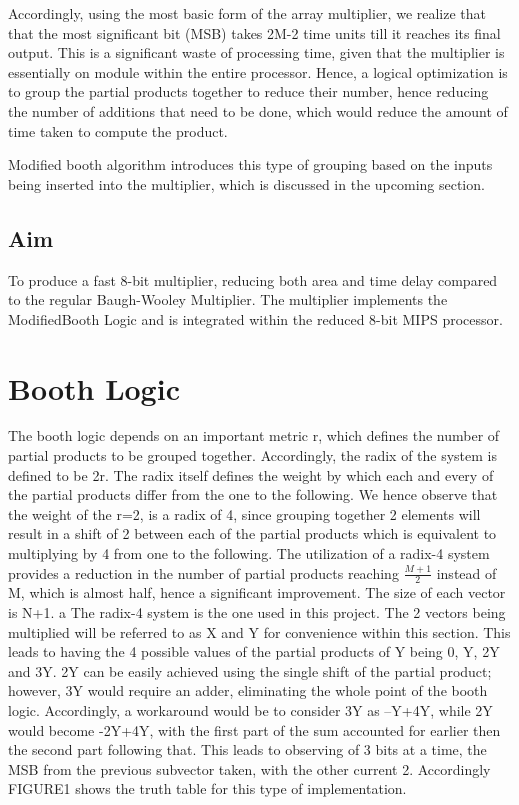 \documentclass[conference]{IEEEtran}
\begin{document}
Accordingly, using the most basic form of the array multiplier, we realize that that the most significant bit (MSB) takes 2M-2 time units till it reaches its final output. This is a significant waste of processing time, given that the multiplier is essentially on module within the entire processor. Hence, a logical optimization is to group the partial products together to reduce their number, hence reducing the number of additions that need to be done, which would reduce the amount of time taken to compute the product.

Modified booth algorithm introduces this type of grouping based on the inputs being inserted into the multiplier, which is discussed in the upcoming section.


\subsection{Aim}

To produce a fast 8-bit multiplier, reducing both area and time delay compared to the regular Baugh-Wooley Multiplier. The multiplier implements the ModifiedBooth Logic and is integrated within the reduced 8-bit MIPS processor.


\section{Booth Logic}

The booth logic depends on an important metric r, which defines the number of partial products to be grouped together. Accordingly, the radix of the system is defined to be 2r. The radix itself defines the weight by which each and every of the partial products differ from the one to the following. We hence observe that the weight of the r=2, is a radix of 4, since grouping together 2 elements will result in a shift of 2 between each of the partial products which is equivalent to multiplying by 4 from one to the following. The utilization of a radix-4 system provides a reduction in the number of partial products reaching $\frac{M+1}{2}$
instead of M, which is almost half, hence a significant improvement. The size of each vector is N+1.
a
The radix-4 system is the one used in this project. The 2 vectors being multiplied will be referred to as X and Y for convenience within this section. This leads to having the 4 possible values of the partial products of Y being 0, Y, 2Y and 3Y. 2Y can be easily achieved using the single shift of the partial product; however, 3Y would require an adder, eliminating the whole point of the booth logic. Accordingly, a workaround would be to consider 3Y as –Y+4Y, while 2Y would become -2Y+4Y, with the first part of the sum accounted for earlier then the second part following that. This leads to observing of 3 bits at a time, the MSB from the previous subvector taken, with the other current 2. Accordingly FIGURE1 shows the truth table for this type of implementation.
\end{document}
